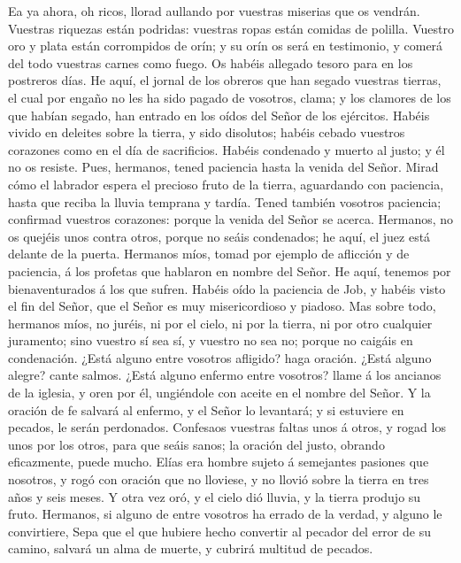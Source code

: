  Ea ya ahora, oh ricos, llorad aullando por vuestras
miserias que os vendrán.  Vuestras riquezas están
podridas: vuestras ropas están comidas de polilla. 
Vuestro oro y plata están corrompidos de orín; y su orín os será en
testimonio, y comerá del todo vuestras carnes como fuego. Os habéis
allegado tesoro para en los postreros días.  He aquí, el
jornal de los obreros que han segado vuestras tierras, el cual por
engaño no les ha sido pagado de vosotros, clama; y los clamores de los
que habían segado, han entrado en los oídos del Señor de los ejércitos.
 Habéis vivido en deleites sobre la tierra, y sido
disolutos; habéis cebado vuestros corazones como en el día de
sacrificios.  Habéis condenado y muerto al justo; y él no
os resiste.  Pues, hermanos, tened paciencia hasta la
venida del Señor. Mirad cómo el labrador espera el precioso fruto de la
tierra, aguardando con paciencia, hasta que reciba la lluvia temprana y
tardía.  Tened también vosotros paciencia; confirmad
vuestros corazones: porque la venida del Señor se acerca. 
Hermanos, no os quejéis unos contra otros, porque no seáis condenados;
he aquí, el juez está delante de la puerta.  Hermanos
míos, tomad por ejemplo de aflicción y de paciencia, á los profetas que
hablaron en nombre del Señor.  He aquí, tenemos por
bienaventurados á los que sufren. Habéis oído la paciencia de Job, y
habéis visto el fin del Señor, que el Señor es muy misericordioso y
piadoso.  Mas sobre todo, hermanos míos, no juréis, ni
por el cielo, ni por la tierra, ni por otro cualquier juramento; sino
vuestro sí sea sí, y vuestro no sea no; porque no caigáis en
condenación.  ¿Está alguno entre vosotros afligido? haga
oración. ¿Está alguno alegre? cante salmos.  ¿Está alguno
enfermo entre vosotros? llame á los ancianos de la iglesia, y oren por
él, ungiéndole con aceite en el nombre del Señor.  Y la
oración de fe salvará al enfermo, y el Señor lo levantará; y si
estuviere en pecados, le serán perdonados.  Confesaos
vuestras faltas unos á otros, y rogad los unos por los otros, para que
seáis sanos; la oración del justo, obrando eficazmente, puede mucho.
 Elías era hombre sujeto á semejantes pasiones que
nosotros, y rogó con oración que no lloviese, y no llovió sobre la
tierra en tres años y seis meses.  Y otra vez oró, y el
cielo dió lluvia, y la tierra produjo su fruto. 
Hermanos, si alguno de entre vosotros ha errado de la verdad, y alguno
le convirtiere,  Sepa que el que hubiere hecho convertir
al pecador del error de su camino, salvará un alma de muerte, y cubrirá
multitud de pecados.
